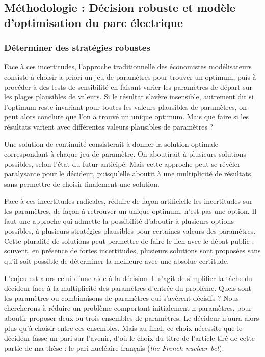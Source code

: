 \subsection{Méthodologie : Décision robuste et modèle d’optimisation du parc électrique}

\subsubsection{Déterminer des stratégies robustes}

Face à ces incertitudes, l’approche traditionnelle des économistes modélisateurs consiste à choisir a priori un jeu de paramètres pour trouver un optimum, puis à procéder à des tests de sensibilité en faisant varier les paramètres de départ sur les plages plausibles de valeurs. Si le résultat s’avère insensible, autrement dit si l’optimum reste invariant pour toutes les valeurs plausibles de paramètres, on peut alors conclure que l’on a trouvé un unique optimum.
Mais que faire si les résultats varient avec différentes valeurs plausibles de paramètres ? 

Une solution de continuité consisterait à donner la solution optimale correspondant à chaque jeu de paramètre. On aboutirait à plusieurs solutions possibles, selon l'état du futur anticipé. Mais cette approche peut se révéler paralysante pour le décideur, puisqu'elle aboutit à une multiplicité de résultats, sans permettre de choisir finalement une solution.

Face à ces incertitudes radicales, réduire de façon artificielle les incertitudes sur les paramètres, de façon à retrouver un unique optimum, n’est pas une option. Il faut une approche qui admette la possibilité d’aboutir à plusieurs options possibles, à plusieurs stratégies plausibles pour certaines valeurs des paramètres. Cette pluralité de solutions peut permettre de faire le lien avec le débat public : souvent, en présence de fortes incertitudes, plusieurs solutions sont proposées sans qu’il soit possible de déterminer la meilleure avec une absolue certitude. 

L’enjeu est alors celui d’une aide à la décision. Il s’agit de simplifier la tâche du décideur face à la multiplicité des paramètres d’entrée du problème. Quels sont les paramètres ou combinaisons de paramètres qui s’avèrent décisifs ? Nous chercherons à réduire un problème comportant initialement n paramètres, pour aboutir proposer deux ou trois ensembles de paramètres. Le décideur n’aura alors plus qu’à choisir entre ces ensembles. Mais au final, ce choix nécessite que le décideur fasse un pari sur l’avenir, d’où le choix du titre de l’article tiré de cette partie de ma thèse : le pari nucléaire français (\textit{the French nuclear bet}).

